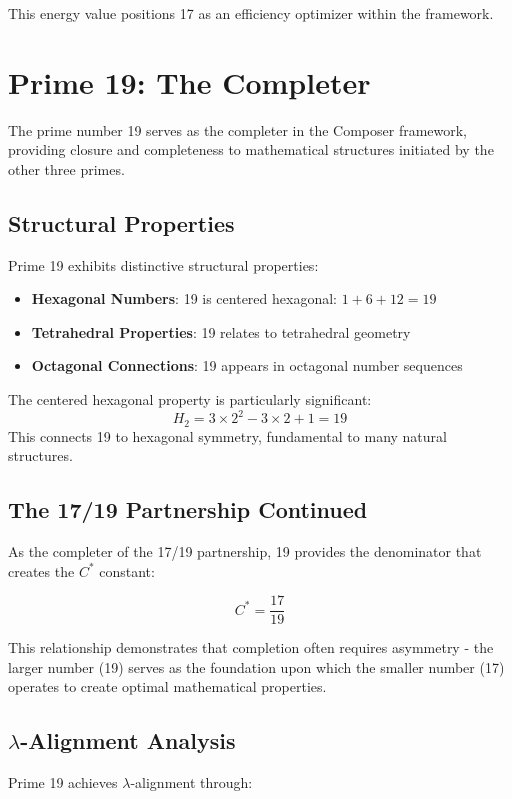 \documentclass[12pt,a4paper]{report}
\newcommand{\Cstar}{C^*}
\begin{document}
This energy value positions 17 as an efficiency optimizer within the framework.

\section{Prime 19: The Completer}

The prime number 19 serves as the completer in the Composer framework, providing closure and completeness to mathematical structures initiated by the other three primes.

\subsection{Structural Properties}

Prime 19 exhibits distinctive structural properties:

\begin{itemize}
\item \textbf{Hexagonal Numbers}: 19 is centered hexagonal: $1 + 6 + 12 = 19$
\item \textbf{Tetrahedral Properties}: 19 relates to tetrahedral geometry
\item \textbf{Octagonal Connections}: 19 appears in octagonal number sequences
\end{itemize}

The centered hexagonal property is particularly significant:
\[
H_2 = 3 \times 2^2 - 3 \times 2 + 1 = 19
\]
This connects 19 to hexagonal symmetry, fundamental to many natural structures.

\subsection{The 17/19 Partnership Continued}

As the completer of the 17/19 partnership, 19 provides the denominator that creates the $\Cstar$ constant:

\[
\Cstar = \frac{17}{19}
\]

This relationship demonstrates that completion often requires asymmetry - the larger number (19) serves as the foundation upon which the smaller number (17) operates to create optimal mathematical properties.

\subsection{$\lambda$-Alignment Analysis}

Prime 19 achieves $\lambda$-alignment through:
\end{document}
